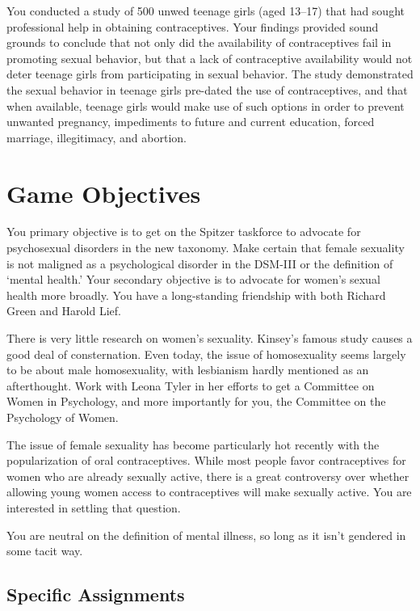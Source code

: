 \begin{refsection}
You conducted a study of 500 unwed teenage girls (aged 13--17) that had sought professional help in obtaining contraceptives. Your findings provided sound grounds to conclude that not only did the availability of contraceptives fail in promoting sexual behavior, but that a lack of contraceptive availability would not deter teenage girls from participating in sexual behavior. The study demonstrated the sexual behavior in teenage girls pre-dated the use of contraceptives, and that when available, teenage girls would make use of such options in order to prevent unwanted pregnancy, impediments to future and current education, forced marriage, illegitimacy, and abortion.

\section{Game Objectives}
\label{gameobjectives}

You primary objective is to get on the Spitzer taskforce to advocate for psychosexual disorders in the new taxonomy. Make certain that female sexuality is not maligned as a psychological disorder in the DSM-III or the definition of `mental health.' Your secondary objective is to advocate for women's sexual health more broadly. You have a long-standing friendship with both Richard Green and Harold Lief.

There is very little research on women's sexuality. Kinsey's famous study causes a good deal of consternation. Even today, the issue of homosexuality seems largely to be about male homosexuality, with lesbianism hardly mentioned as an afterthought. Work with Leona Tyler in her efforts to get a Committee on Women in Psychology, and more importantly for you, the Committee on the Psychology of Women.

The issue of female sexuality has become particularly hot recently with the popularization of oral contraceptives. While most people favor contraceptives for women who are already sexually active, there is a great controversy over whether allowing young women access to contraceptives will make sexually active. You are interested in settling that question.

You are neutral on the definition of mental illness, so long as it isn't gendered in some tacit way.

\subsection{Specific Assignments}
\label{specificassignments}


\end{refsection}

